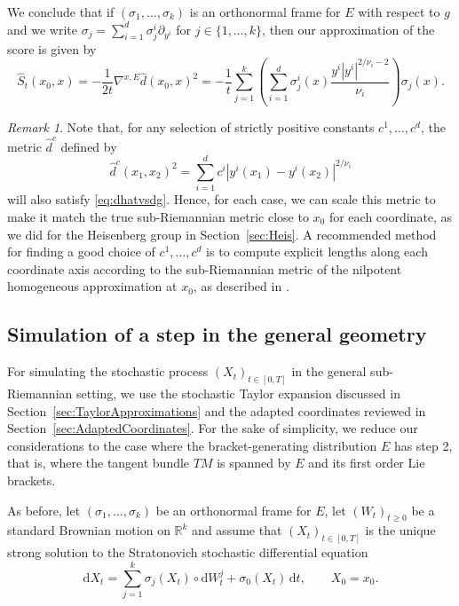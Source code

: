 \documentclass[10pt]{amsart}
\newcounter{dummy} \numberwithin{dummy}{section}
\theoremstyle{remark}
\newtheorem{remark}[dummy]{Remark}
\newcommand{\R}{\mathbb{R}}
\newcommand{\dd}{\,{\mathrm d}}
\newcommand{\db}{{\mathrm d}}
\numberwithin{equation}{section}
\begin{document}
We conclude that if $(\sigma_1, \dots, \sigma_k)$ is an orthonormal frame for $E$ with respect to $g$ and we write $\sigma_j = \sum_{i=1}^d \sigma^i_j \partial_{y^i}$ for $j\in\{1,\dots,k\}$, then our approximation of the score is given by
\begin{equation}\label{eq:approximatescore}
\hat S_t(x_0,x) = - \frac{1}{2t} \nabla^{x,E} \hat d(x_0,x)^2 = - \frac{1}{t} \sum_{j=1}^k \left( \sum_{i=1}^d \sigma_j^i(x) \frac{ y^i |y^i|^{2/\nu_i-2}}{\nu_i} \right) \sigma_j(x).
\end{equation}

\begin{remark}
Note that, for any selection of strictly positive constants $c^1,\dots, c^d$, the metric $\hat d^c$ defined by
$$\hat d^c(x_1,x_2)^2 = \sum_{i=1}^d c^i |y^i(x_1) - y^i(x_2)|^{2/\nu_i}$$
will also satisfy \eqref{eq:dhatvsdg}. Hence, for each case, we can scale this metric to make it match the true sub-Riemannian metric close to $x_0$ for each coordinate, as we did for the Heisenberg group in Section~\ref{sec:Heis}. A recommended method for finding a good choice of $c^1, \dots, c^d$ is to compute explicit lengths along each coordinate axis according to the sub-Riemannian metric of the nilpotent homogeneous approximation at $x_0$, as described in \cite[Section~5.3]{bellaiche1996tangent}.
\end{remark}


\subsection{Simulation of a step in the general geometry} \label{sec:SimStep}
For simulating the stochastic process $(X_t)_{t\in[0,T]}$ in the general sub-Riemannian setting, we use the stochastic Taylor expansion discussed in Section~\ref{sec:TaylorApproximations} and the adapted coordinates reviewed in Section~\ref{sec:AdaptedCoordinates}. For the sake of simplicity, we reduce our considerations to the case where the bracket-generating distribution $E$ has step 2, that is, where the tangent bundle $TM$ is spanned by $E$ and its first order Lie brackets.

As before, let $(\sigma_1, \dots, \sigma_k)$ be an orthonormal frame for $E$, let $(W_t)_{t\geq 0}$ be a standard Brownian motion on $\R^k$ and assume that $(X_t)_{t\in[0,T]}$ is the unique strong solution to the Stratonovich stochastic differential equation
$$\db X_t = \sum_{j=1}^k \sigma_j(X_t) \circ \db W_t^j + \sigma_0(X_t) \dd t,\qquad X_0=x_0.$$
\end{document}
